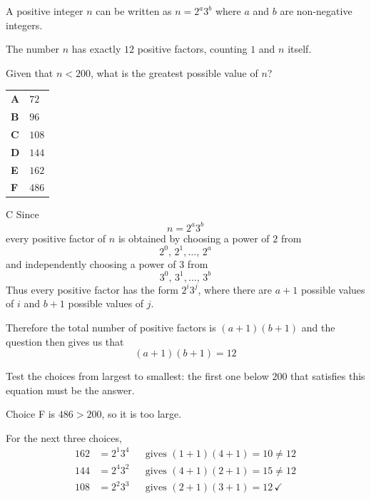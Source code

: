\documentclass[11pt,a4paper]{article}
\begin{document}
\begin{enumerate}[label=\textbf{\arabic*.},leftmargin=*,itemsep=0pt,start=5]
\questionitem[Number]
A positive integer $n$ can be written as $n = 2^a3^b$ where $a$ and $b$ are non-negative integers. 

The number $n$ has exactly $12$ positive factors, counting $1$ and $n$ itself. 

Given that $n<200$, what is the greatest possible value of $n$?

\par\vspace*{12pt}
\begin{tabularx}{\linewidth}{@{}>{\bfseries}l Y@{}}
A &
$72$
\\[0.8em]
B &
$96$
\\[0.8em]
C &
$108$
\\[0.8em]
D &
$144$
\\[0.8em]
E &
$162$
\\[0.8em]
F &
$486$
\\
\end{tabularx}

\begin{djsSolution}{C}
Since
\[
n=2^a3^b
\]
every positive factor of \(n\) is obtained by choosing a power of \(2\) from
\[
2^0,\,2^1,\ldots,\,2^a
\]
and independently choosing a power of \(3\) from
\[
3^0,\,3^1,\ldots,\,3^b
\]
Thus every positive factor has the form \(2^i3^j\), where there are \(a+1\) possible values of \(i\) and \(b+1\) possible values of \(j\). 

Therefore the total number of positive factors is \((a+1)(b+1)\) and the question then gives us that
\[
(a+1)(b+1)=12
\]

Test the choices from largest to smallest: the first one below $200$ that satisfies this equation must be the answer. 

Choice F is $486>200$, so it is too large. 

For the next three choices,
\[\begin{aligned}
162&=2^1 3^4 &&\text{gives }(1+1)(4+1)=10\neq12\\
144&=2^4 3^2 &&\text{gives }(4+1)(2+1)=15\neq12\\
108&=2^2 3^3 &&\text{gives }(2+1)(3+1)=12 \,\checkmark
\end{aligned}\]


\end{djsSolution}
\end{enumerate}
\end{document}
